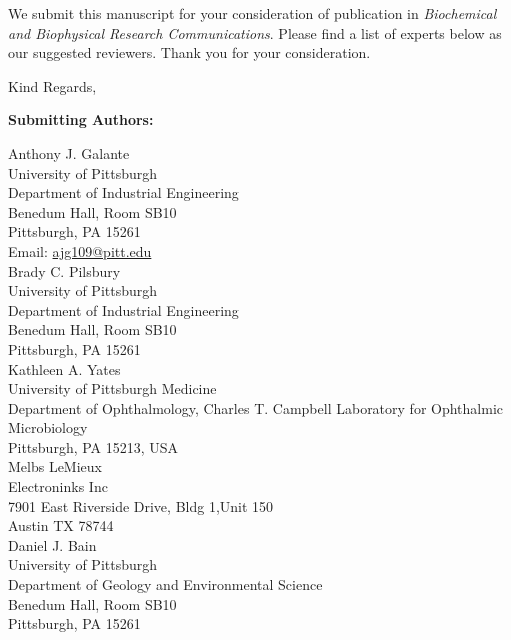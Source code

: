 \documentclass[11pt]{letter}
\begin{document}
\begin{letter}{}
We submit this manuscript for your consideration of publication in %
\textit{Biochemical and Biophysical Research Communications}.
Please find a list of experts below as our suggested reviewers.
Thank you for your consideration.

\closing{Kind Regards,}


\end{letter}

\newpage

\textbf{Submitting Authors:}

Anthony J. Galante\\
University of Pittsburgh \\
Department of Industrial Engineering \\
Benedum Hall, Room SB10 \\
Pittsburgh, PA 15261\\
Email:  \href{mailto:ajg109@pitt.edu}{ajg109@pitt.edu}\\

Brady C. Pilsbury \\
University of Pittsburgh \\
Department of Industrial Engineering \\
Benedum Hall, Room SB10 \\
Pittsburgh, PA 15261\\

Kathleen A. Yates\\
University of Pittsburgh Medicine\\
Department of Ophthalmology, Charles T. Campbell Laboratory for Ophthalmic Microbiology\\
Pittsburgh, PA 15213, USA\\

Melbs LeMieux \\
Electroninks Inc \\ 
7901 East Riverside Drive, Bldg 1,Unit 150\\
Austin TX  78744 \\

Daniel J. Bain \\
University of Pittsburgh \\
Department of Geology and Environmental Science\\
Benedum Hall, Room SB10 \\
Pittsburgh, PA 15261\\
\end{document}
